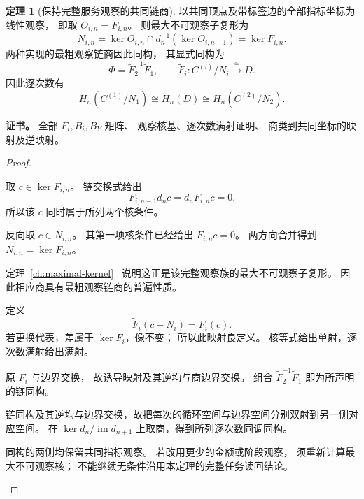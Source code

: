 \documentclass[UTF8,12pt,a4paper,openany,fontset=none,zihao=false]{ctexrep}
\theoremstyle{definition}
\newtheorem{theorem}{定理}[chapter]
\newenvironment{certificate}{\par\noindent\textbf{证书。}\ignorespaces}{\par}
\newcommand{\1}{\mathbf 1}
\begin{document}
\begin{theorem}[保持完整服务观察的共同链商]
\label{std:chain-isomorphism}
以共同顶点及带标签边的全部指标坐标为线性观察，
即取 \(O_{i,n}=F_{i,n}\)。
则最大不可观察子复形为
\[
N_{i,n}
=\ker O_{i,n}\cap
d_n^{-1}(\ker O_{i,n-1})
=\ker F_{i,n}.
\]
两种实现的最粗观察链商因此同构，
其显式同构为
\[
\Phi=\widetilde F_2^{-1}\widetilde F_1,\qquad
\widetilde F_i:C^{(i)}/N_i\xrightarrow{\cong}D.
\]
因此逐次数有
\[
H_n(C^{(1)}/N_1)\cong H_n(D)\cong H_n(C^{(2)}/N_2).
\]
\end{theorem}
\begin{certificate}
全部 \(F_i,B_i,B_Y\) 矩阵、
观察核基、逐次数满射证明、
商类到共同坐标的映射及逆映射。
\end{certificate}
\begin{proof}
\begin{semanticsteps}
\item 取 \(c\in\ker F_{i,n}\)。
链交换式给出
\[
F_{i,n-1}d_nc=d_nF_{i,n}c=0.
\]
所以该 \(c\) 同时属于所列两个核条件。
\item 反向取 \(c\in N_{i,n}\)。
其第一项核条件已经给出
\(F_{i,n}c=0\)。
两方向合并得到 \(N_{i,n}=\ker F_{i,n}\)。
\item 定理~\ref{ch:maximal-kernel}~
说明这正是该完整观察族的最大不可观察子复形。
因此相应商具有最粗观察链商的普遍性质。
\item 定义
\[
\widetilde F_i(c+N_i)=F_i(c).
\]
若更换代表，差属于 \(\ker F_i\)，像不变；
所以此映射良定义。
核等式给出单射，逐次数满射给出满射。
\item 原 \(F_i\) 与边界交换，
故诱导映射及其逆均与商边界交换。
组合 \(\widetilde F_2^{-1}\widetilde F_1\)
即为所声明的链同构。
\item 链同构及其逆均与边界交换，故把每次的循环空间与边界空间分别双射到另一侧对应空间。
在 \(\ker d_n/\operatorname{im}d_{n+1}\) 上取商，得到所列逐次数同调同构。
\item 同构的两侧均保留共同指标观察。
若改用更少的金额或阶段观察，
须重新计算最大不可观察核；
不能继续无条件沿用本定理的完整任务读回结论。
\end{semanticsteps}
\end{proof}
\end{document}
